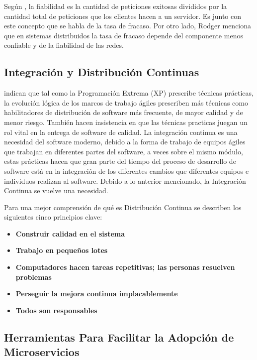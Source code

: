 Según \cite{rodger2017tao}, la fiabilidad es la cantidad de peticiones exitosas divididos
por la cantidad total de peticiones que los clientes hacen a un servidor.
Es junto con este concepto que se habla de la tasa de fracaso.
Por otro lado, Rodger menciona que en sistemas distribuidos la tasa de fracaso depende del
componente menos confiable y de la fiabilidad de las redes.


\subsection{Integración y Distribución Continuas}

\cite{humble2018accelerate} indican que tal como la Programación Extrema (XP) prescribe técnicas prácticas,
la evolución lógica de los marcos de trabajo ágiles prescriben más técnicas como habilitadores de
distribución de software más frecuente, de mayor calidad y de menor riesgo.
También hacen insistencia en que las técnicas practicas juegan un rol vital en la entrega de software de calidad.
La integración continua es una necesidad del software moderno, debido a la forma de trabajo de equipos
ágiles que trabajan en diferentes partes del software, a veces sobre el mismo módulo, estas prácticas
hacen que gran parte del tiempo del proceso de desarrollo de software está en la integración
de los diferentes cambios que diferentes equipos e individuos realizan al software.
Debido a lo anterior mencionado, la Integración Continua se vuelve una necesidad.

Para una mejor comprensión de qué es Distribución Continua se describen los siguientes cinco principios clave:

\begin{itemize}
  \item \textbf{Construir calidad en el sistema}
  \item \textbf{Trabajo en pequeños lotes}
  \item \textbf{Computadores hacen tareas repetitivas; las personas resuelven problemas}
  \item \textbf{Perseguir la mejora continua implacablemente}
  \item \textbf{Todos son responsables}
\end{itemize}


\subsection{Herramientas Para Facilitar la Adopción de Microservicios}
